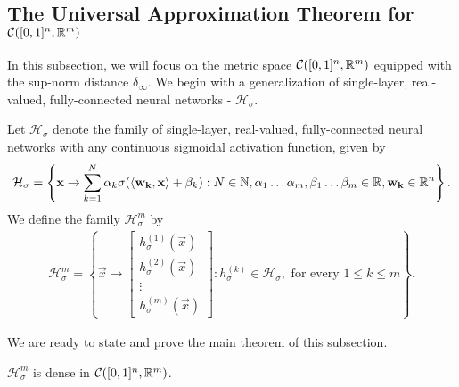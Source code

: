 \pagebreak
\subsection{The Universal Approximation Theorem for ${\mathcal C}([0,1]^n, {\mathbb R}^m)$}
\label{subsection:universality:cybenko:5}

In this subsection, we will focus on the metric space ${\mathcal C}([0,1]^n, {\mathbb R}^m)$ equipped with the sup-norm distance $\delta_\infty$.
We begin with a generalization of single-layer, real-valued, fully-connected neural networks - $\mathcal{H}_\sigma$.
\begin{definition}
Let $\mathcal{H}_{\sigma}$ denote the family of single-layer, real-valued, fully-connected neural networks with any continuous sigmoidal activation function, given by \begin{align*}
\mathcal{H}_{\sigma} = \left \{ \mathbf{x} \to \sum_{k=1}^{N} \alpha_k \sigma{\left (\langle \mathbf{w_k}, \mathbf{x} \rangle + \beta_k \right)} : N \in {\mathbb N}, \alpha_1 \ldots \alpha_m, \beta_1 \ldots \beta_m \in {\mathbb R}, \mathbf{w_k} \in {\mathbb R}^n \right \}.
\end{align*}
We define the family $\mathcal{H}_{\sigma}^{m}$ by \begin{align*}
\mathcal{H}_{\sigma}^m = \left \{ \vec{x} \to \begin{bmatrix}
           h_\sigma^{(1)}(\vec{x}) \\
           h_\sigma^{(2)}(\vec{x}) \\
           \vdots \\
           h_\sigma^{(m)}(\vec{x})
         \end{bmatrix} : h_\sigma^{(k)} \in \mathcal{H}_\sigma, \text{ for every } 1 \leq k \leq m \right \} .
\end{align*} 
\end{definition}
We are ready to state and prove the main theorem of this subsection.
\begin{theorem}
\label{thm:universality:cybenko:vector-valued:uap}
$\mathcal{H}_{\sigma}^{m}$ is dense in ${\mathcal C}([0,1]^n, {\mathbb R}^m)$.
\end{theorem}
